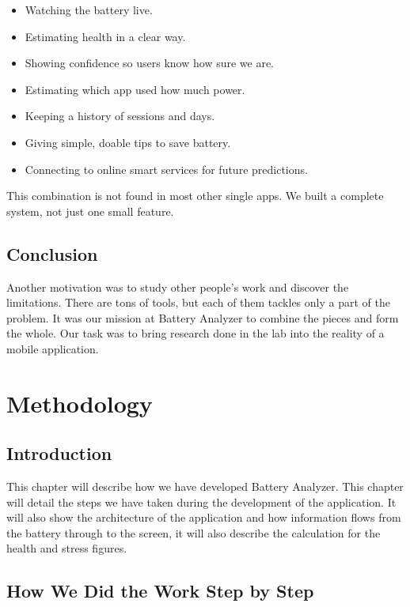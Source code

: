 \documentclass[12pt,a4paper]{report}
\begin{document}
\begin{itemize}
    \item Watching the battery live.
    \item Estimating health in a clear way.
    \item Showing confidence so users know how sure we are.
    \item Estimating which app used how much power.
    \item Keeping a history of sessions and days.
    \item Giving simple, doable tips to save battery.
    \item Connecting to online smart services for future predictions.
\end{itemize}

This combination is not found in most other single apps. We built a complete system, not just one small feature.

\section{Conclusion}
Another motivation was to study other people’s work and discover the limitations. There are tons of tools, but each of them tackles only a part of the problem. It was our mission at Battery Analyzer to combine the pieces and form the whole. Our task was to bring research done in the lab into the reality of a mobile application.

\chapter{Methodology}

\section{Introduction}
This chapter will describe how we have developed Battery Analyzer. This chapter will detail the steps we have taken during the development of the application. It will also show the architecture of the application and how information flows from the battery through to the screen, it will also describe the calculation for the health and stress figures.

\section{How We Did the Work Step by Step}
\end{document}
